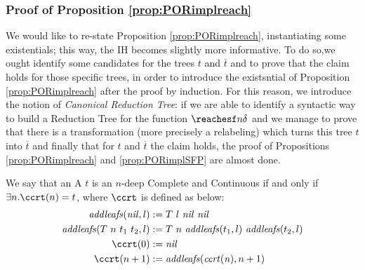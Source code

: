 \begin{conditional}{\notappendix}
    \subsubsection{Proof of Proposition \ref{prop:PORimplreach}}


    We would like to re-state Proposition \ref{prop:PORimplreach},
    instantiating some existentials; this way, the IH becomes
    slightly more informative.
    To do so,we ought identify some candidates for the trees
    $t$ and $\overline t$ and to prove that the claim holds for those specific
    trees, in order to introduce the existsntial of
    Proposition \ref{prop:PORimplreach} after the proof by induction.
    For this reason, we introduce the notion of \emph{Canonical Reduction Tree}:
    if we are able to identify a syntactic way to build a Reduction Tree
    for the function $\reachesf n \delta$ and we manage to prove that there is
    a transformation (more precisely a relabeling) which turns this tree $t$
    into $\overline t$ and finally that for $t$ and $\overline t$
    the claim holds, the proof of Propositions \ref{prop:PORimplreach} and
    \ref{prop:PORimplSFP} are almost done.

    \begin{defn}
      We say that an \rt A $t$ is an $n$-deep Complete and Continuous
      if and only if
      $\exists n. \ccrt(n)=t$, where $\ccrt$ is defined as below:
      \begin{align*}
        \mathit{addleafs}(\mathit{nil}, l) &:= T\ l\ \mathit{nil}\ \mathit{nil}\\
        \mathit{addleafs}(T\ n\ t_1\ t_2, l) &:= T\ n\ \mathit{addleafs}(t_1, l)\ \mathit{addleafs}(t_2, l)\\
        \ccrt(0) &:= \mathit{nil}\\
        \ccrt(n+1) &:= \mathit{addleafs}(\mathit{ccrt(n)}, n+1)\\
      \end{align*}
    \end{defn}

    \begin{figure}[]
\end{figure}
\end{conditional}
